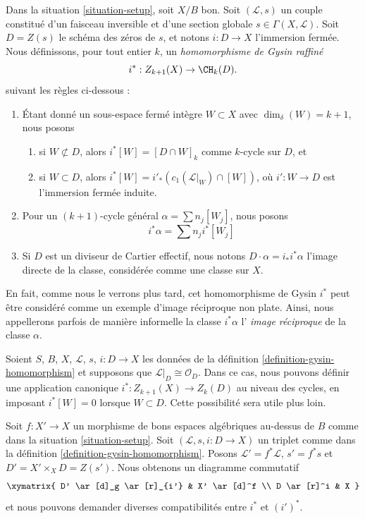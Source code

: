 \begin{definition}
\label{definition-gysin-homomorphism}
Dans la situation \ref{situation-setup}, soit $X/B$ bon. Soit
$(\mathcal{L}, s)$ un couple constitué d'un faisceau inversible et d'une section
globale $s \in \Gamma(X, \mathcal{L})$. Soit $D = Z(s)$ le schéma des zéros
de $s$, et notons $i : D \to X$ l'immersion fermée. Nous définissons, pour
tout entier $k$, un {\it homomorphisme de Gysin raffiné}
$$
i^* : Z_{k + 1}(X) \to \CH_k(D).
$$
suivant les règles ci-dessous :
\begin{enumerate}
\item Étant donné un sous-espace fermé intègre $W \subset X$ avec
$\dim_\delta(W) = k + 1$, nous posons
\begin{enumerate}
\item si $W \not \subset D$, alors $i^*[W] = [D \cap W]_k$ comme
$k$-cycle sur $D$, et
\item si $W \subset D$, alors $i^*[W] = i'_*(c_1(\mathcal{L}|_W) \cap [W])$,
où $i' : W \to D$ est l'immersion fermée induite.
\end{enumerate}
\item Pour un $(k + 1)$-cycle général $\alpha = \sum n_j[W_j]$, nous
posons
$$
i^*\alpha = \sum n_j i^*[W_j]
$$
\item Si $D$ est un diviseur de Cartier effectif, nous notons $D \cdot
\alpha = i_*i^*\alpha$ l'image directe de la classe, considérée comme une classe sur $X$.
\end{enumerate}
\end{definition}

\noindent
En fait, comme nous le verrons plus tard, cet homomorphisme de Gysin $i^*$
peut être considéré comme un exemple d'image réciproque non plate. Ainsi, nous
appellerons parfois de manière informelle la classe $i^*\alpha$ l'{\it
image réciproque} de la classe $\alpha$.

\begin{remark}
\label{remark-on-cycles}
Soient $S$, $B$, $X$, $\mathcal{L}$, $s$, $i : D \to X$ les données de la définition
\ref{definition-gysin-homomorphism} et supposons que $\mathcal{L}|_D \cong
\mathcal{O}_D$. Dans ce cas, nous pouvons définir une application canonique $i^* :
Z_{k + 1}(X) \to Z_k(D)$ au niveau des cycles, en imposant $i^*[W] = 0$ lorsque
$W \subset D$. Cette possibilité sera utile plus loin.
\end{remark}

\begin{remark}
\label{remark-pullback-pairs}
Soit $f : X' \to X$ un morphisme de bons espaces algébriques au-dessus de $B$ comme
dans la situation \ref{situation-setup}. Soit $(\mathcal{L}, s, i : D \to X)$
un triplet comme dans la définition \ref{definition-gysin-homomorphism}.
Posons $\mathcal{L}' = f^*\mathcal{L}$, $s' = f^*s$ et
$D' = X' \times_X D = Z(s')$. Nous obtenons un diagramme commutatif
$$
\xymatrix{
D' \ar[d]_g \ar[r]_{i'} & X' \ar[d]^f \\
D \ar[r]^i & X
}
$$
et nous pouvons demander diverses compatibilités entre $i^*$ et $(i')^*$.
\end{remark}

